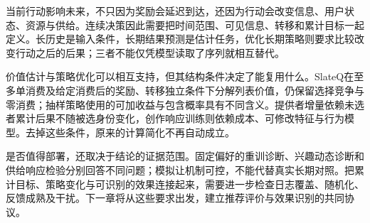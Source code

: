 当前行动影响未来，不只因为奖励会延迟到达，还因为行动会改变信息、用户状态、资源与供给。连续决策因此需要把时间范围、可见信息、转移和累计目标一起定义。长历史是输入条件，长期结果预测是估计任务，优化长期策略则要求比较改变行动之后的后果；三者不能仅凭模型读取了序列就相互替代。

价值估计与策略优化可以相互支持，但其结构条件决定了能复用什么。SlateQ在至多单消费及给定消费后的奖励、转移独立条件下分解列表价值，仍保留选择竞争与零消费；抽样策略使用的可加收益与包含概率具有不同含义。提供者增量依赖未选者累计后果不随被选身份变化，创作响应训练则依赖成本、可修改特征与行为模型。去掉这些条件，原来的计算简化不再自动成立。

是否值得部署，还取决于结论的证据范围。固定偏好的重训诊断、兴趣动态诊断和供给响应检验分别回答不同问题；模拟让机制可控，不能代替真实长期对照。把累计目标、策略变化与可识别的效果连接起来，需要进一步检查日志覆盖、随机化、反馈成熟及干扰。下一章将从这些要求出发，建立推荐评价与效果识别的共同协议。
